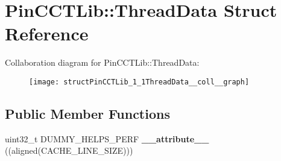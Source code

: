 \hypertarget{structPinCCTLib_1_1ThreadData}{\section{Pin\-C\-C\-T\-Lib\-:\-:Thread\-Data Struct Reference}
\label{structPinCCTLib_1_1ThreadData}
}


Collaboration diagram for Pin\-C\-C\-T\-Lib\-:\-:Thread\-Data\-:
\nopagebreak
\begin{figure}[H]
\begin{center}
\leavevmode
\texttt{[image: structPinCCTLib\_1\_1ThreadData\_\_coll\_\_graph]}
\end{center}
\end{figure}
\subsection*{Public Member Functions}
\begin{DoxyCompactItemize}
\item 
\hypertarget{structPinCCTLib_1_1ThreadData_a3d57be420421ce4b0664b76fa27757cc}{uint32\-\_\-t D\-U\-M\-M\-Y\-\_\-\-H\-E\-L\-P\-S\-\_\-\-P\-E\-R\-F {\bfseries \-\_\-\-\_\-attribute\-\_\-\-\_\-} ((aligned(C\-A\-C\-H\-E\-\_\-\-L\-I\-N\-E\-\_\-\-S\-I\-Z\-E)))}\label{structPinCCTLib_1_1ThreadData_a3d57be420421ce4b0664b76fa27757cc}

\end{DoxyCompactItemize}
